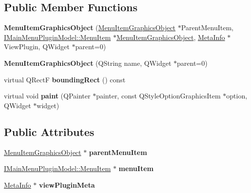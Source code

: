 \subsection*{Public Member Functions}
\begin{DoxyCompactItemize}
\item 
\mbox{\label{class_menu_item_graphics_object_a4ebc6be4ca5c88adcf7931e62161d5f1}} 
{\bfseries Menu\+Item\+Graphics\+Object} (\hyperlink{class_menu_item_graphics_object}{Menu\+Item\+Graphics\+Object} $\ast$Parent\+Menu\+Item, \hyperlink{struct_i_main_menu_plugin_model_1_1_menu_item}{I\+Main\+Menu\+Plugin\+Model\+::\+Menu\+Item} $\ast$\hyperlink{class_menu_item_graphics_object}{Menu\+Item\+Graphics\+Object}, \hyperlink{struct_meta_info}{Meta\+Info} $\ast$View\+Plugin, Q\+Widget $\ast$parent=0)
\item 
\mbox{\label{class_menu_item_graphics_object_a4fabd069df87e7d05c94cd9027aa345b}} 
{\bfseries Menu\+Item\+Graphics\+Object} (Q\+String name, Q\+Widget $\ast$parent=0)
\item 
\mbox{\label{class_menu_item_graphics_object_ab17f3bcb176ffd6550df607a3e8eb3a9}} 
virtual Q\+RectF {\bfseries bounding\+Rect} () const
\item 
\mbox{\label{class_menu_item_graphics_object_a00a392d4eeba783e2e8f73211adf8732}} 
virtual void {\bfseries paint} (Q\+Painter $\ast$painter, const Q\+Style\+Option\+Graphics\+Item $\ast$option, Q\+Widget $\ast$widget)
\end{DoxyCompactItemize}
\subsection*{Public Attributes}
\begin{DoxyCompactItemize}
\item 
\mbox{\label{class_menu_item_graphics_object_a94290bfb4d0a10a7adb0516c84239b53}} 
\hyperlink{class_menu_item_graphics_object}{Menu\+Item\+Graphics\+Object} $\ast$ {\bfseries parent\+Menu\+Item}
\item 
\mbox{\label{class_menu_item_graphics_object_a059d772c31b4c5113290a2198150f8d6}} 
\hyperlink{struct_i_main_menu_plugin_model_1_1_menu_item}{I\+Main\+Menu\+Plugin\+Model\+::\+Menu\+Item} $\ast$ {\bfseries menu\+Item}
\item 
\mbox{\label{class_menu_item_graphics_object_a8d9594a1c25a956d3e34cab975dde29a}} 
\hyperlink{struct_meta_info}{Meta\+Info} $\ast$ {\bfseries view\+Plugin\+Meta}
\end{DoxyCompactItemize}
